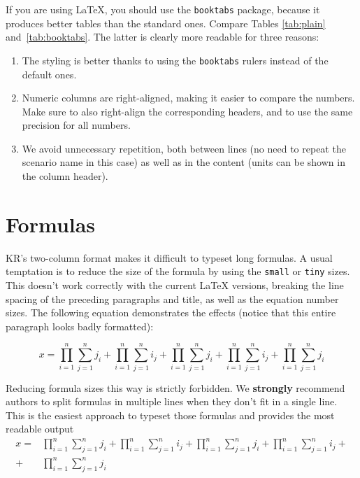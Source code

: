 \documentclass{article}
\begin{document}
If you are using \LaTeX, you should use the \texttt{booktabs} package, because
it produces better tables than the standard ones. Compare Tables
\ref{tab:plain} and~\ref{tab:booktabs}. The latter is clearly more readable for
three reasons:

\begin{enumerate}
\item The styling is better thanks to using the \texttt{booktabs} rulers
  instead of the default ones.
\item Numeric columns are right-aligned, making it easier to compare the
  numbers. Make sure to also right-align the corresponding headers, and to use
  the same precision for all numbers.
\item We avoid unnecessary repetition, both between lines (no need to repeat
  the scenario name in this case) as well as in the content (units can be shown
  in the column header).
\end{enumerate}

\section{Formulas}

KR's two-column format makes it difficult to typeset long formulas. A usual
temptation is to reduce the size of the formula by using the \texttt{small} or
\texttt{tiny} sizes. This doesn't work correctly with the current \LaTeX{}
versions, breaking the line spacing of the preceding paragraphs and title, as
well as the equation number sizes. The following equation demonstrates the
effects (notice that this entire paragraph looks badly formatted):
%
\begin{tiny}
\begin{equation}
    x = \prod_{i=1}^n \sum_{j=1}^n j_i + \prod_{i=1}^n \sum_{j=1}^n i_j + \prod_{i=1}^n \sum_{j=1}^n j_i + \prod_{i=1}^n \sum_{j=1}^n i_j + \prod_{i=1}^n \sum_{j=1}^n j_i
\end{equation}
\end{tiny}%

Reducing formula sizes this way is strictly forbidden. We \textbf{strongly}
recommend authors to split formulas in multiple lines when they don't fit in a
single line. This is the easiest approach to typeset those formulas and
provides the most readable output%
%
\begin{align}
    x =& \prod_{i=1}^n \sum_{j=1}^n j_i + \prod_{i=1}^n \sum_{j=1}^n i_j + \prod_{i=1}^n \sum_{j=1}^n j_i + \prod_{i=1}^n \sum_{j=1}^n i_j + \nonumber\\
    + & \prod_{i=1}^n \sum_{j=1}^n j_i
\end{align}%
\end{document}
